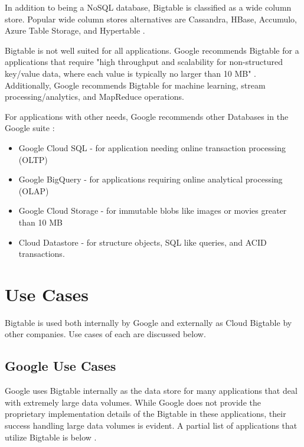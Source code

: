 \documentclass[9pt,twocolumn,twoside]{styles/osajnl}
\begin{document}
In addition to being a NoSQL database, Bigtable is classified as a wide column store.  Popular wide column stores alternatives are Cassandra, HBase, Accumulo, Azure Table Storage, and Hypertable \cite{www-dbengineswide}.

Bigtable is not well suited for all applications.  Google recommends Bigtable for a applications that require "high throughput and scalability for non-structured key/value data, where each value is typically no larger than 10 MB" \cite{www-bigtabledocoverview}.  Additionally, Google recommends Bigtable for machine learning, stream processing/analytics, and MapReduce operations.\cite{www-bigtabledocoverview}

For applications with other needs, Google recommends other Databases in the Google suite \cite{www-bigtabledocoverview}:

\vspace{-\topsep}
\begin{itemize}
\item Google Cloud SQL - for application needing online transaction processing (OLTP)
\item Google BigQuery - for applications requiring online analytical processing (OLAP) 
\item Google Cloud Storage - for immutable blobs like images or movies greater than 10 MB 
\item Cloud Datastore - for structure objects, SQL like queries, and ACID transactions.
\end{itemize}
\vspace{-\topsep}

\section{Use Cases}

Bigtable is used both internally by Google and externally as Cloud Bigtable by other companies.  Use cases of each are discussed below.

\subsection{Google Use Cases}

Google uses Bigtable internally as the data store for many applications that deal with extremely large data volumes. While Google does not provide the proprietary implementation details of the Bigtable in these applications, their success handling large data volumes is evident.  A partial list of applications that utilize Bigtable is below \cite{www-wikibigtable}.
\end{document}
